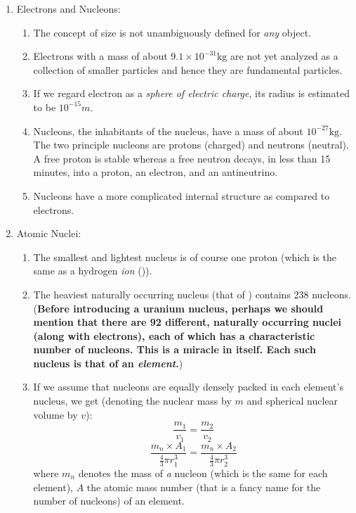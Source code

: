 \documentclass[12pt,a4paper]{book}
\begin{document}
\begin{enumerate}
    \item Electrons and Nucleons: 
        \begin{enumerate}
            \item The concept of size is not unambiguously defined for \emph{any} object.
            \item Electrons with a mass of about $9.1\times 10^{-31}\si{\kg}$ are not yet analyzed as a collection of smaller particles and hence they are fundamental particles.
            \item If we regard electron as a \emph{sphere of electric charge}, its radius is estimated to be $10^{-15}\si{m}$.
            \item Nucleons, the inhabitants of the nucleus, have a mass of about $10^{-27}\si{\kg}$. The two principle nucleons are protons (charged) and neutrons (neutral). A free proton is stable whereas a free neutron decays, in less than 15 minutes, into a proton, an electron, and an antineutrino. 
            \item Nucleons have a more complicated internal structure as compared to electrons.
        \end{enumerate}
    \item Atomic Nuclei:
        \begin{enumerate}
            \item The smallest and lightest nucleus is of course one proton (which is the same as a hydrogen \emph{ion} ()). 
            \item The heaviest naturally occurring nucleus (that of ) contains 238 nucleons. (\textbf{Before introducing a uranium nucleus, perhaps we should mention that there are 92 different, naturally occurring nuclei (along with electrons), each of which has a characteristic number of nucleons. This is a miracle in itself. Each such nucleus is that of an \emph{element}.})
            \item If we assume that nucleons are equally densely packed in each element's nucleus, we get (denoting the nuclear mass by $m$ and spherical nuclear volume by $v$):
                $$
                    \frac{m_1}{v_1} = \frac{m_2}{v_2}
                $$
                $$
                    \frac{m_n\times A_1}{\frac{4}{3}\pi r_1^{3}}
                    =
                    \frac{m_n\times A_2}{\frac{4}{3}\pi r_2^{3}}
                $$
                where $m_n$ denotes the mass of \emph{a} nucleon (which is the same for each element), $A$ the atomic mass number (that is a fancy name for the number of nucleons) of an element.


\end{enumerate}
\end{enumerate}
\end{document}
